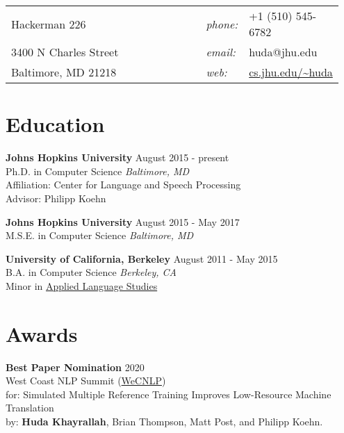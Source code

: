 \documentclass[margin,line,hyperref,color]{res}
\begin{document}
 \sloppy




\begin{resume}




\begin{tabular}{@{\hskip0pt}p{0.69\linewidth}p{0.06\linewidth} p{0.2\linewidth}@{\hskip0pt}}
  \setlength\tabcolsep{0pt} %
Hackerman 226             & \textit{phone:} & +1 (510) 545-6782\\
3400 N Charles Street     & \textit{email:} & huda@jhu.edu\\
Baltimore, MD 21218       & \textit{web:}   & \url{cs.jhu.edu/~huda}
\end{tabular}


\section{\sc Education}
\textbf{Johns Hopkins University} \hfill August 2015 - present\\
Ph.D. in Computer Science \hfill \textit{Baltimore, MD}\\
Affiliation: Center for Language and Speech Processing\\
Advisor: Philipp Koehn

\textbf{Johns Hopkins University} \hfill August 2015 - May 2017\\
M.S.E. in Computer Science \hfill \textit{Baltimore, MD}

\textbf{University of California, Berkeley } \hfill August 2011 - May 2015\\
B.A. in Computer Science  \hfill \textit{Berkeley, CA}\\
Minor in \href{https://als.ugis.berkeley.edu/}{Applied Language Studies}

\section{\sc Awards}
\textbf{Best Paper Nomination} \hfill 2020\\ 
West Coast NLP Summit  (\href{https://www.wecnlp.ai/}{WeCNLP})\\
for: Simulated Multiple Reference Training Improves Low-Resource Machine Translation\\ 
by: \textbf{Huda Khayrallah}, Brian Thompson, Matt Post, and Philipp Koehn.
 

\end{resume}
\end{document}
